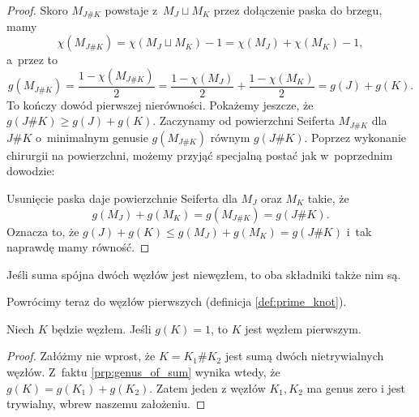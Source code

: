 \begin{proof}
    Skoro $M_{J\#K}$ powstaje z~$M_J \sqcup M_K$ przez dołączenie paska do brzegu, mamy
    \[
        \chi(M_{J\#K}) = \chi(M_J \sqcup M_K) - 1 = \chi(M_J) + \chi(M_K)-1,
    \]
    a~przez to
    \[
        g(M_{J\#K}) = \frac{1-\chi(M_{J\#K})}{2} =
        \frac{1-\chi(M_{J})}{2} + \frac{1-\chi(M_{K})}{2}
        = g(J) + g(K).
    \]
    To kończy dowód pierwszej nierówności.
    Pokażemy jeszcze, że $g(J \# K) \ge g(J)+g(K)$.
    Zaczynamy od powierzchni Seiferta $M_{J\#K}$ dla $J\#K$ o~minimalnym genusie $g(M_{J\#K})$ równym $g(J\#K)$.
    Poprzez wykonanie chirurgii na powierzchni, możemy przyjąć specjalną postać jak w~poprzednim dowodzie:
\begin{comment}
    \[
        \begin{tikzpicture}[baseline=-0.65ex,scale=0.16]
            \fill[blue!10!white] (-5, -5) rectangle(5, 5);
        \draw[semithick,fill=white] (-5, -5) to [out=right, in=left] (-2, -2) -- (2, -2) to [out=right, in=left] (5, -5);
        \draw[semithick,fill=white] (-5,  5) to [out=right, in=left] (-2,  2) -- (2,  2) to [out=right, in=left] (5,  5);
            \node at (0, 0) {$M_{J \# K}$};
        \end{tikzpicture}
    \]
\end{comment}

    Usunięcie paska daje powierzchnie Seiferta dla $M_J$ oraz $M_K$ takie, że
    \[
        g(M_J)+g(M_K)=g(M_{J\#K})=g(J\#K).
    \]
    Oznacza to, że $g(J)+g(K)\leqslant g(M_J)+g(M_K)=g(J\#K)$ i~tak naprawdę mamy równość.
\end{proof}

\begin{corollary}
    \label{cor:connected_sum_no_inverses}
    Jeśli suma spójna dwóch węzłów jest niewęzłem, to oba składniki także nim są.
\end{corollary}

Powrócimy teraz do węzłów pierwszych (definicja \ref{def:prime_knot}).
%

\begin{proposition}
    Niech $K$ będzie węzłem.
    Jeśli $g(K) = 1$, to $K$ jest węzłem pierwszym.
\end{proposition}

\begin{proof}
    Załóżmy nie wprost, że $K = K_1 \# K_2$ jest sumą dwóch nietrywialnych węzłów.
    Z~faktu \ref{prp:genus_of_sum} wynika wtedy, że $g(K) = g(K_1) + g(K_2)$.
    Zatem jeden z węzłów $K_1, K_2$ ma genus zero i jest trywialny, wbrew naszemu założeniu.
\end{proof}

